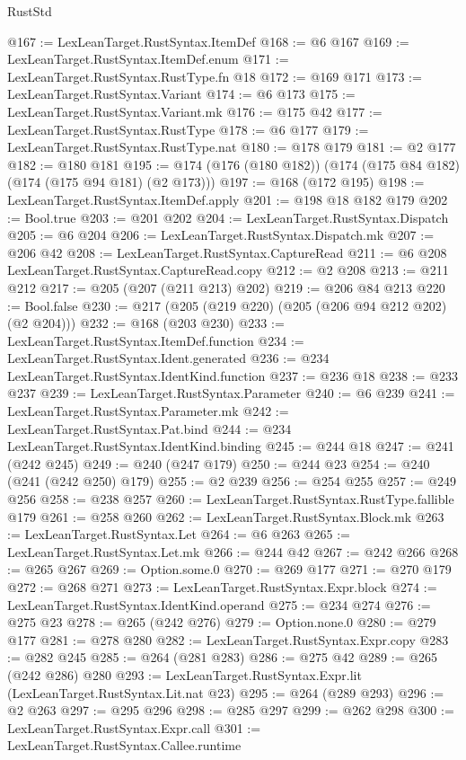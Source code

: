 \begin{lexlean}{RustStd}
\begin{coremodule}
@167 := LexLeanTarget.RustSyntax.ItemDef
@168 := @6 @167
@169 := LexLeanTarget.RustSyntax.ItemDef.enum
@171 := LexLeanTarget.RustSyntax.RustType.fn @18
@172 := @169 @171
@173 := LexLeanTarget.RustSyntax.Variant
@174 := @6 @173
@175 := LexLeanTarget.RustSyntax.Variant.mk
@176 := @175 @42
@177 := LexLeanTarget.RustSyntax.RustType
@178 := @6 @177
@179 := LexLeanTarget.RustSyntax.RustType.nat
@180 := @178 @179
@181 := @2 @177
@182 := @180 @181
@195 := @174 (@176 (@180 @182)) (@174 (@175 @84 @182) (@174 (@175 @94 @181) (@2 @173)))
@197 := @168 (@172 @195)
@198 := LexLeanTarget.RustSyntax.ItemDef.apply
@201 := @198 @18 @182 @179
@202 := Bool.true
@203 := @201 @202
@204 := LexLeanTarget.RustSyntax.Dispatch
@205 := @6 @204
@206 := LexLeanTarget.RustSyntax.Dispatch.mk
@207 := @206 @42
@208 := LexLeanTarget.RustSyntax.CaptureRead
@211 := @6 @208 LexLeanTarget.RustSyntax.CaptureRead.copy
@212 := @2 @208
@213 := @211 @212
@217 := @205 (@207 (@211 @213) @202)
@219 := @206 @84 @213
@220 := Bool.false
@230 := @217 (@205 (@219 @220) (@205 (@206 @94 @212 @202) (@2 @204)))
@232 := @168 (@203 @230)
@233 := LexLeanTarget.RustSyntax.ItemDef.function
@234 := LexLeanTarget.RustSyntax.Ident.generated
@236 := @234 LexLeanTarget.RustSyntax.IdentKind.function
@237 := @236 @18
@238 := @233 @237
@239 := LexLeanTarget.RustSyntax.Parameter
@240 := @6 @239
@241 := LexLeanTarget.RustSyntax.Parameter.mk
@242 := LexLeanTarget.RustSyntax.Pat.bind
@244 := @234 LexLeanTarget.RustSyntax.IdentKind.binding
@245 := @244 @18
@247 := @241 (@242 @245)
@249 := @240 (@247 @179)
@250 := @244 @23
@254 := @240 (@241 (@242 @250) @179)
@255 := @2 @239
@256 := @254 @255
@257 := @249 @256
@258 := @238 @257
@260 := LexLeanTarget.RustSyntax.RustType.fallible @179
@261 := @258 @260
@262 := LexLeanTarget.RustSyntax.Block.mk
@263 := LexLeanTarget.RustSyntax.Let
@264 := @6 @263
@265 := LexLeanTarget.RustSyntax.Let.mk
@266 := @244 @42
@267 := @242 @266
@268 := @265 @267
@269 := Option.some.{0}
@270 := @269 @177
@271 := @270 @179
@272 := @268 @271
@273 := LexLeanTarget.RustSyntax.Expr.block
@274 := LexLeanTarget.RustSyntax.IdentKind.operand
@275 := @234 @274
@276 := @275 @23
@278 := @265 (@242 @276)
@279 := Option.none.{0}
@280 := @279 @177
@281 := @278 @280
@282 := LexLeanTarget.RustSyntax.Expr.copy
@283 := @282 @245
@285 := @264 (@281 @283)
@286 := @275 @42
@289 := @265 (@242 @286) @280
@293 := LexLeanTarget.RustSyntax.Expr.lit (LexLeanTarget.RustSyntax.Lit.nat @23)
@295 := @264 (@289 @293)
@296 := @2 @263
@297 := @295 @296
@298 := @285 @297
@299 := @262 @298
@300 := LexLeanTarget.RustSyntax.Expr.call
@301 := LexLeanTarget.RustSyntax.Callee.runtime

\end{coremodule}
\end{lexlean}
